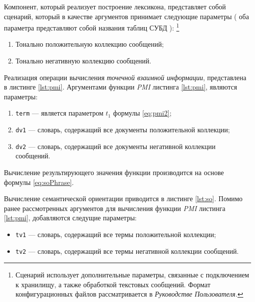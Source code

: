     Компонент, который реализует построение лексикона, представляет собой
    сценарий, который в качестве аргументов принимает следующие параметры
    (
        оба параметра представляют собой названия таблиц СУБД
    ):
    \footnote{Сценарий использует дополнительные параметры, связанные
    с подключением к хранилищу, а также обработкой текстовых сообщений.
    Формат конфигурационных файлов рассматривается в {\it Руководстве
    Пользователя.}}

    \begin{enumerate}
        \item Тонально положительную коллекцию сообщений;
        \item Тонально негативную коллекцию сообщений.
    \end{enumerate}

    Реализация операции вычисления {\it точечной взаимной информации},
    представлена в листинге \ref{lst:pmi}.
    Аргументами функции {\it PMI} листинга \ref{lst:pmi}, являются параметры:
    \begin{enumerate}
        \item {\tt term} --- является параметром $t_1$
            формулы \ref{eq:pmi2};
        \item {\tt dv1} --- словарь, содержащий все документы положительной коллекции;
        \item {\tt dv2} --- словарь, содержащий все документы негативной коллекции сообщений.
    \end{enumerate}

    Вычисление результирующего значения функции производится на основе формулы \ref{eq:soPhrase}.

    \lstset{style=python}
    

    Вычисление семантической ориентации приводится в листинге \ref{lst:so}.
    Помимо ранее рассмотренных аргументов для вычисления функции {\it PMI}
    листинга \ref{lst:pmi}, добавляются следущие параметры:
    \begin{itemize}
        \item {\tt tv1} --- словарь, содержащий все термы положительной коллекции;
        \item {\tt tv2} --- словарь, содержащий все термы негативной коллекции сообщений.
    \end{itemize}

    \lstset{style=python}
    

